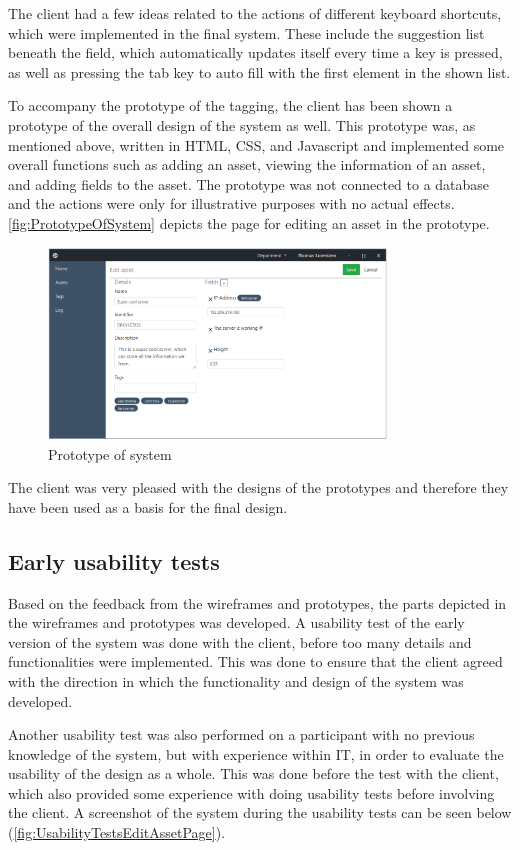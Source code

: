 The client had a few ideas related to the actions of different keyboard shortcuts, which were implemented in the final system. These include the suggestion list beneath the field, which automatically updates itself every time a key is pressed, as well as pressing the tab key to auto fill with the first element in the shown list.
\par
To accompany the prototype of the tagging, the client has been shown a prototype of the overall design of the system as well. This prototype was, as mentioned above, written in HTML, CSS, and Javascript and implemented some overall functions such as adding an asset, viewing the information of an asset, and adding fields to the asset. The prototype was not connected to a database and the actions were only for illustrative purposes with no actual effects. \autoref{fig:PrototypeOfSystem} depicts the page for editing an asset in the prototype.

\begin{figure}[H]
    \centering
    \includegraphics[width=0.8\textwidth]{figures/Prototypes/AssetEditor_Prototype.png}
    \caption{Prototype of system}
    \label{fig:PrototypeOfSystem}
\end{figure}

The client was very pleased with the designs of the prototypes and therefore they have been used as a basis for the final design.

\subsection{Early usability tests}
Based on the feedback from the wireframes and prototypes, the parts depicted in the wireframes and prototypes was developed. A usability test of the early version of the system was done with the client, before too many details and functionalities were implemented. This was done to ensure that the client agreed with the direction in which the functionality and design of the system was developed. 
\par
Another usability test was also performed on a participant with no previous knowledge of the system, but with experience within IT, in order to evaluate the usability of the design as a whole. This was done before the test with the client, which also provided some experience with doing usability tests before involving the client. A screenshot of the system during the usability tests can be seen below (\autoref{fig:UsabilityTestsEditAssetPage}).

